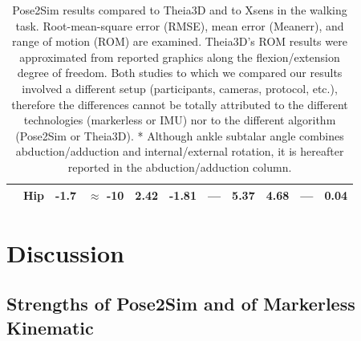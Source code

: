 \begin{table}[!ht]
{\begin{tabular}{lllllllllll}
                    &	Hip& -1.7 & $\approx$ -10 & 2.42 & -1.81 & — & 5.37 & 4.68 & — & 0.04 \\
          \bottomrule
      \end{tabular}}
      \caption{Pose2Sim results compared to Theia3D \cite{Kanko2021b} and to Xsens \cite{Zhang2013} in the walking task. Root-mean-square error (RMSE), mean error (Meanerr), and range of motion (ROM) are examined. Theia3D’s ROM results were approximated from reported graphics along the flexion/extension degree of freedom. Both studies to which we compared our results involved a different setup (participants, cameras, protocol, etc.), therefore the differences cannot be totally attributed to the different technologies (markerless or IMU) nor to the different algorithm (Pose2Sim or Theia3D). * Although ankle subtalar angle combines abduction/adduction and internal/external rotation, it is hereafter reported in the abduction/adduction column.}
      \label{table:tab_theiaxsens}
\end{table}


\section{Discussion}

\subsection{Strengths of Pose2Sim and of Markerless Kinematic}

